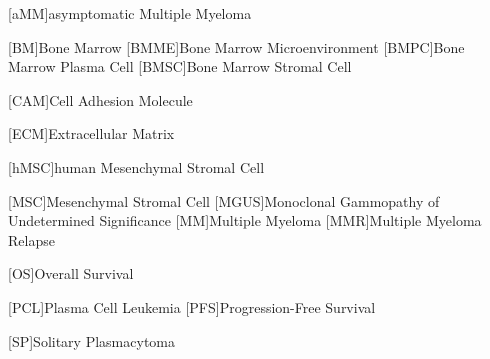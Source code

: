 
%
\label{sec:Abbreviations}%

{
    \small
    \begin{acronym}
        [aMM]{asymptomatic Multiple Myeloma}

        [BM]{Bone Marrow}
        [BMME]{Bone Marrow Microenvironment}
        [BMPC]{Bone Marrow Plasma Cell}
        [BMSC]{Bone Marrow Stromal Cell}

        [CAM]{Cell Adhesion Molecule}

        [ECM]{Extracellular Matrix}

        [hMSC]{human Mesenchymal Stromal Cell}

        [MSC]{Mesenchymal Stromal Cell}
        [MGUS]{Monoclonal Gammopathy of Undetermined Significance}
        [MM]{Multiple Myeloma}
        [MMR]{Multiple Myeloma Relapse}

        [OS]{Overall Survival}

        [PCL]{Plasma Cell Leukemia}
        [PFS]{Progression-Free Survival}

        [SP]{Solitary Plasmacytoma}



    \end{acronym}
}